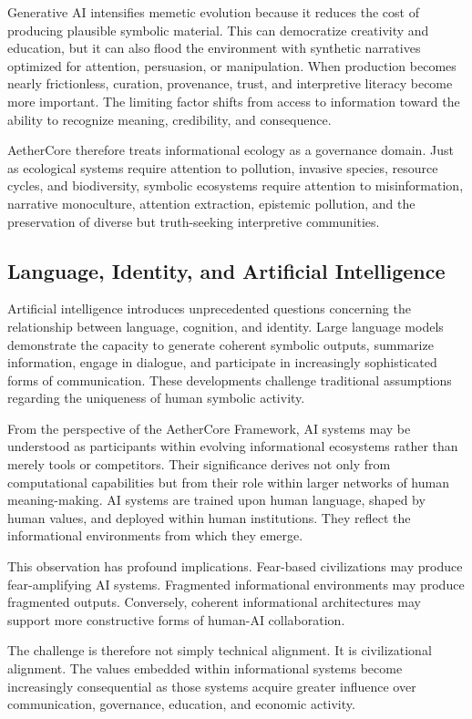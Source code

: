 \documentclass[12pt]{article}
\begin{document}
Generative AI intensifies memetic evolution because it reduces the cost of producing plausible symbolic material. This can democratize creativity and education, but it can also flood the environment with synthetic narratives optimized for attention, persuasion, or manipulation. When production becomes nearly frictionless, curation, provenance, trust, and interpretive literacy become more important. The limiting factor shifts from access to information toward the ability to recognize meaning, credibility, and consequence.

AetherCore therefore treats informational ecology as a governance domain. Just as ecological systems require attention to pollution, invasive species, resource cycles, and biodiversity, symbolic ecosystems require attention to misinformation, narrative monoculture, attention extraction, epistemic pollution, and the preservation of diverse but truth-seeking interpretive communities.

\subsection{Language, Identity, and Artificial Intelligence}

Artificial intelligence introduces unprecedented questions concerning the relationship between language, cognition, and identity. Large language models demonstrate the capacity to generate coherent symbolic outputs, summarize information, engage in dialogue, and participate in increasingly sophisticated forms of communication. These developments challenge traditional assumptions regarding the uniqueness of human symbolic activity.

From the perspective of the AetherCore Framework, AI systems may be understood as participants within evolving informational ecosystems rather than merely tools or competitors. Their significance derives not only from computational capabilities but from their role within larger networks of human meaning-making. AI systems are trained upon human language, shaped by human values, and deployed within human institutions. They reflect the informational environments from which they emerge.

This observation has profound implications. Fear-based civilizations may produce fear-amplifying AI systems. Fragmented informational environments may produce fragmented outputs. Conversely, coherent informational architectures may support more constructive forms of human-AI collaboration.

The challenge is therefore not simply technical alignment. It is civilizational alignment. The values embedded within informational systems become increasingly consequential as those systems acquire greater influence over communication, governance, education, and economic activity.
\end{document}
